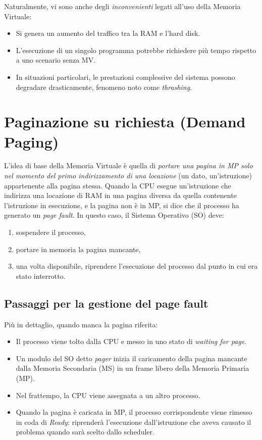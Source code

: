 Naturalmente, vi sono anche degli \emph{inconvenienti} legati all'uso della Memoria Virtuale:
\begin{itemize}
    \item Si genera un aumento del traffico tra la RAM e l’hard disk.
    \item L'esecuzione di un singolo programma potrebbe richiedere più tempo rispetto a uno scenario senza MV.
    \item In situazioni particolari, le prestazioni complessive del sistema possono degradare drasticamente, fenomeno noto come \emph{thrashing}.
\end{itemize}

\section{Paginazione su richiesta (Demand Paging)}
L'idea di base della Memoria Virtuale è quella di \emph{portare una pagina in MP solo nel momento del primo indirizzamento di una locazione} (un dato, un'istruzione) appartenente alla pagina stessa.
Quando la CPU esegue un'istruzione che indirizza una locazione di RAM in una pagina diversa da quella contenente l'istruzione in esecuzione, e la pagina non è in MP, si dice che il processo ha generato un \emph{page fault}. In questo caso, il Sistema Operativo (SO) deve:
\begin{enumerate}
    \item sospendere il processo,
    \item portare in memoria la pagina mancante,
    \item una volta disponibile, riprendere l'esecuzione del processo dal punto in cui era stato interrotto.
\end{enumerate}
\subsection*{Passaggi per la gestione del page fault}
Più in dettaglio, quando manca la pagina riferita:
\begin{itemize}
    \item Il processo viene tolto dalla CPU e messo in uno stato di \emph{waiting for page}.
    \item Un modulo del SO detto \emph{pager} inizia il caricamento della pagina mancante dalla Memoria Secondaria (MS) in un frame libero della Memoria Primaria (MP).
    \item Nel frattempo, la CPU viene assegnata a un altro processo.
    \item Quando la pagina è caricata in MP, il processo corrispondente viene rimesso in coda di \emph{Ready}: riprenderà l'esecuzione dall'istruzione che aveva causato il problema quando sarà scelto dallo scheduler.
\end{itemize}
